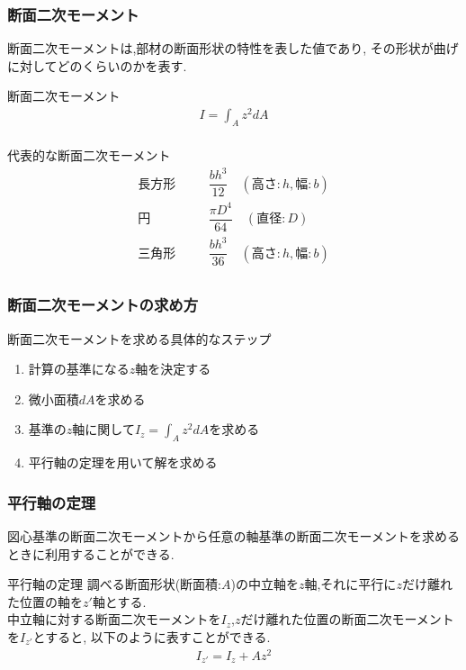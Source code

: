 \documentclass[a4paper]{jsarticle}
\begin{document}
\subsubsection{断面二次モーメント}
断面二次モーメントは,部材の断面形状の特性を表した値であり,
その形状が曲げに対してどのくらいのかを表す.
\begin{itembox}[l]{断面二次モーメント}
    \begin{eqnarray*}
        \displaystyle I=\int_Az^2dA\\
    \end{eqnarray*}
\end{itembox}
\begin{itembox}[l]{代表的な断面二次モーメント}
    \begin{eqnarray*}
        長方形\quad&&\dfrac{bh^3}{12}\quad(高さ:h,幅:b)\\
        円\qquad&&\dfrac{\pi D^4}{64}\quad(直径:D)\\
        三角形\quad&&\dfrac{bh^3}{36}\quad(高さ:h,幅:b)\\
    \end{eqnarray*}
\end{itembox}
\subsubsection{断面二次モーメントの求め方}
\begin{itembox}[l]{断面二次モーメントを求める具体的なステップ}
    \begin{enumerate}[(1)]
        \item 計算の基準になる$z$軸を決定する
        \item 微小面積$dA$を求める
        \item 基準の$z$軸に関して$I_z=\int_Az^2dA$を求める
        \item 平行軸の定理を用いて解を求める
    \end{enumerate}
\end{itembox}
\subsubsection{平行軸の定理}
図心基準の断面二次モーメントから任意の軸基準の断面二次モーメントを求めるときに利用することができる.
\begin{itembox}[l]{平行軸の定理}
    調べる断面形状(断面積:$A$)の中立軸を$z$軸,それに平行に$z$だけ離れた位置の軸を$z'$軸とする.\\
    中立軸に対する断面二次モーメントを$I_z$,$z$だけ離れた位置の断面二次モーメントを$I_{z'}$とすると,
    以下のように表すことができる.
    \begin{eqnarray*}
        I_{z'}=I_z+Az^2\\
    \end{eqnarray*}
\end{itembox}
\end{document}
